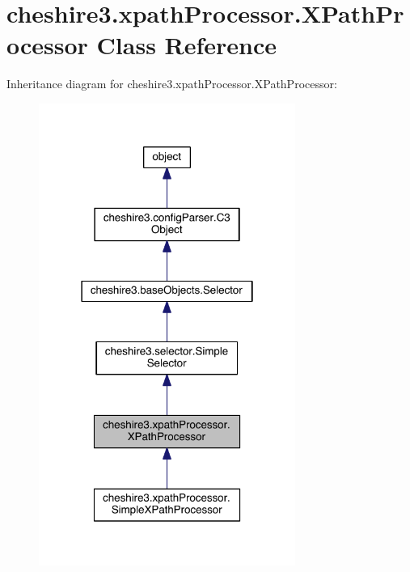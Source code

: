 \hypertarget{classcheshire3_1_1xpath_processor_1_1_x_path_processor}{\section{cheshire3.\-xpath\-Processor.\-X\-Path\-Processor Class Reference}
\label{classcheshire3_1_1xpath_processor_1_1_x_path_processor}
}


Inheritance diagram for cheshire3.\-xpath\-Processor.\-X\-Path\-Processor\-:
\nopagebreak
\begin{figure}[H]
\begin{center}
\leavevmode
\includegraphics[width=238pt]{classcheshire3_1_1xpath_processor_1_1_x_path_processor__inherit__graph}
\end{center}
\end{figure}


